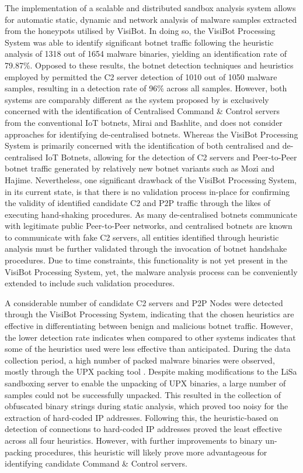 The implementation of a scalable and distributed sandbox analysis system allows for automatic static, dynamic and network analysis of malware samples extracted from the honeypots utilised by VisiBot. In doing so, the VisiBot Processing System was able to identify significant botnet traffic following the heuristic analysis of 1318 out of 1654 malware binaries, yielding an identification rate of 79.87\%. Opposed to these results, the botnet detection techniques and heuristics employed by \citet{Bastos2019} permitted the C2 server detection of 1010 out of 1050 malware samples, resulting in a detection rate of 96\% across all samples. However, both systems are comparably different as the system proposed by \citet{Bastos2019} is exclusively concerned with the identification of Centralised Command \& Control servers from the conventional IoT botnets, Mirai and Bashlite, and does not consider approaches for identifying de-centralised botnets. Whereas the VisiBot Processing System is primarily concerned with the identification of both centralised and de-centralised IoT Botnets, allowing for the detection of C2 servers and Peer-to-Peer botnet traffic generated by relatively new botnet variants such as Mozi and Hajime. Nevertheless, one significant drawback of the VisiBot Processing System, in its current state, is that there is no validation process in-place for confirming the validity of identified candidate C2 and P2P traffic through the likes of executing hand-shaking procedures. As many de-centralised botnets communicate with legitimate public Peer-to-Peer networks, and centralised botnets are known to communicate with fake C2 servers, all entities identified through heuristic analysis must be further validated through the invocation of botnet handshake procedures. Due to time constraints, this functionality is not yet present in the VisiBot Processing System, yet, the malware analysis process can be conveniently extended to include such validation procedures. 

A considerable number of candidate C2 servers and P2P Nodes were detected through the VisiBot Processing System, indicating that the chosen heuristics are effective in differentiating between benign and malicious botnet traffic. However, the lower detection rate indicates when compared to other systems indicates that some of the heuristics used were less effective than anticipated. During the data collection period, a high number of packed malware binaries were observed, mostly through the UPX packing tool \citep{UPX}. Despite making modifications to the LiSa sandboxing server to enable the unpacking of UPX binaries, a large number of samples could not be successfully unpacked. This resulted in the collection of obfuscated binary strings during static analysis, which proved too noisy for the extraction of hard-coded IP addresses. Following this, the heuristic-based on detection of connections to hard-coded IP addresses proved the least effective across all four heuristics. However, with further improvements to binary un-packing procedures, this heuristic will likely prove more advantageous for identifying candidate Command \& Control servers.

